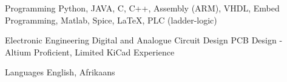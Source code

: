 

\begin{cvskills}


%

  \cvskill
    {Programming} %
    {Python, JAVA, C, C++, Assembly (ARM), VHDL, Embed Programming, Matlab, Spice, LaTeX, PLC (ladder-logic)} %

\cvskill
{Electronic Engineering} %
{Digital and Analogue Circuit Design \newline PCB Design - Altium Proficient, Limited  KiCad Experience } %


  \cvskill
    {Languages} %
    {English, Afrikaans} %
    


\end{cvskills}

